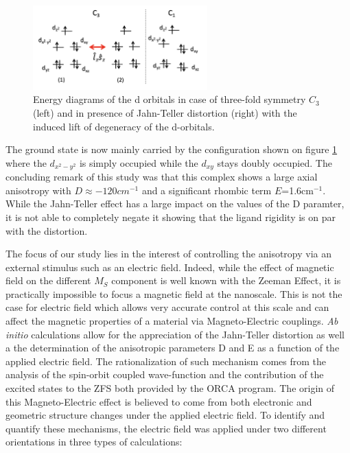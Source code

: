 \documentclass[10pt]{report}
\numberwithin{equation}{section}
\begin{document}
\begin{figure}
    \centering
    \includegraphics[width=0.6\textwidth]{Images/NiMe6tren_config.png}
    \caption{Energy diagrams of the d orbitals in case of three-fold symmetry $C_3$ (left) and in presence of Jahn-Teller distortion (right) with the induced lift of degeneracy of the d-orbitals. }
    \label{NiMe6tren_config}
\end{figure}

The ground state is now mainly carried by the configuration shown on figure \ref{NiMe6tren_config} where the $d_{x^2-y^2}$ is simply occupied while the $d_{xy}$ stays doubly occupied.
The concluding remark of this study was that this complex shows a large axial anisotropy with $D\approx-120cm^{-1}$ and a significant rhombic term $E$=1.6cm$^{-1}$. 
While the Jahn-Teller effect has a large impact on the values of the D paramter, it is not able to completely negate it showing that the ligand rigidity is on par with the distortion.

\par The focus of our study lies in the interest of controlling the anisotropy via an external stimulus such as an electric field.
Indeed, while the effect of magnetic field on the different $M_S$ component is well known with the Zeeman Effect, it is practically impossible to focus a magnetic field at the nanoscale.
This is not the case for electric field which allows very accurate control at this scale and can affect the magnetic properties of a material via Magneto-Electric couplings.
\textit{Ab} \textit{initio} calculations allow for the appreciation of the Jahn-Teller distortion as well a the determination of the anisotropic parameters D and E as a function of the applied electric field.
The rationalization of such mechanism comes from the analysis of the spin-orbit coupled wave-function and the contribution of the excited states to the ZFS both provided by the ORCA program.
The  origin of this Magneto-Electric effect is believed to come from both electronic and geometric structure changes under the applied electric field. 
To identify and quantify these mechanisms, the electric field was applied under two different orientations in three types of calculations:
\end{document}
